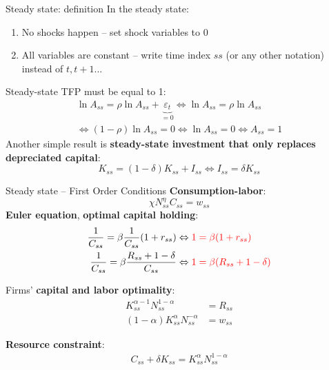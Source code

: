 \documentclass{beamer}
\begin{document}
\begin{frame}{Steady state: definition}
In the steady state:
\begin{enumerate}
    \item No shocks happen -- set shock variables to 0
    \item All variables are constant -- write time index $ss$ (or any other notation) instead of $t, t+1 ...$
\end{enumerate}
\vfill
    Steady-state TFP must be equal to 1:
    \begin{align*}
        \ln A_{ss} = \rho \ln A_{ss} + \underbrace{\varepsilon_t}_{=0}\Leftrightarrow \ln A_{ss} = \rho \ln A_{ss} \\
        \Leftrightarrow (1-\rho) \ln A_{ss} = 0 \Leftrightarrow \ln A_{ss} = 0 \Leftrightarrow A_{ss} = 1 
    \end{align*}
    \vfill
    Another simple result is \textbf{steady-state investment that only replaces depreciated capital}: 
    $$K_{ss} = (1-\delta)K_{ss} + I_{ss} \Leftrightarrow I_{ss} = \delta K_{ss}$$
\end{frame}

\begin{frame}{Steady state -- First Order Conditions}
\textbf{Consumption-labor}:
\begin{equation*}
\chi N_{ss}^\eta C_{ss} = w_{ss}
\end{equation*}
\textbf{Euler equation}, \textbf{optimal capital holding}:
\begin{align*}
  \frac{1}{C_{ss}} =  \beta  \frac{1}{C_{ss}}(1+r_{ss}) &\Leftrightarrow \textcolor{red}{1 = \beta (1+r_{ss})} \\
 \frac{1}{C_{ss}} =  \beta  \frac{R_{ss} + 1 - \delta}{C_{ss}} &\Leftrightarrow \textcolor{red}{1 = \beta(R_{ss} + 1 - \delta)}
\end{align*}
\vfill

Firms' \textbf{capital and labor optimality}: 
  \begin{align*}
	K_{ss}^{\alpha-1} N_{ss}^{1-\alpha} &= R_{ss}\\ (1-\alpha) K_{ss}^{\alpha}N_{ss}^{-\alpha} &= w_{ss} 
\end{align*}

\textbf{Resource constraint}:
\begin{align*}
  C_{ss}+\delta K_{ss}=  K_{ss}^\alpha N_{ss}^{1-\alpha} 
\end{align*}

\end{frame}
\end{document}
